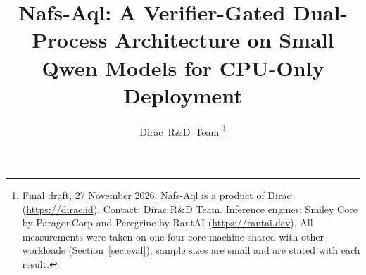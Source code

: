 \documentclass[journal]{IEEEtran}
\theoremstyle{plain}
\theoremstyle{definition}
\begin{document}
\title{Nafs-Aql: A Verifier-Gated Dual-Process Architecture on Small Qwen Models for CPU-Only Deployment}
\author{Dirac~R\&D~Team%
\thanks{Final draft, 27 November 2026. Nafs-Aql is a product of Dirac (\url{https://dirac.id}). Contact: Dirac R\&D Team. Inference engines: Smiley Core by ParagonCorp and Peregrine by RantAI (\url{https://rantai.dev}). All measurements were taken on one four-core machine shared with other workloads (Section~\ref{sec:eval}); sample sizes are small and are stated with each result.}}
\maketitle

\begin{abstract}

\end{abstract}
\end{document}

